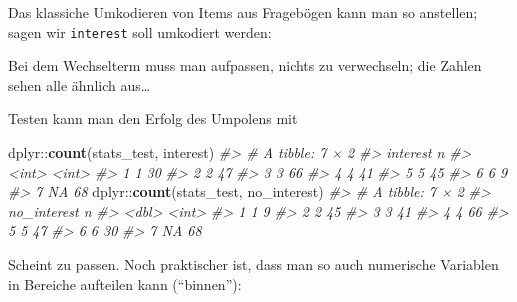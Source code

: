 \documentclass[12pt,]{book}
\newenvironment{Shaded}{\begin{snugshade}}{\end{snugshade}}
\newcommand{\KeywordTok}[1]{\textcolor[rgb]{0.13,0.29,0.53}{\textbf{{#1}}}}
\newcommand{\StringTok}[1]{\textcolor[rgb]{0.31,0.60,0.02}{{#1}}}
\newcommand{\CommentTok}[1]{\textcolor[rgb]{0.56,0.35,0.01}{\textit{{#1}}}}
\newcommand{\NormalTok}[1]{{#1}}
\begin{document}
Das klassiche Umkodieren von Items aus Fragebögen kann man so anstellen;
sagen wir \texttt{interest} soll umkodiert werden:

\begin{Shaded}
\end{Shaded}

Bei dem Wechselterm muss man aufpassen, nichts zu verwechseln; die
Zahlen sehen alle ähnlich aus\ldots{}

Testen kann man den Erfolg des Umpolens mit

\begin{Shaded}
\begin{Highlighting}[]
\NormalTok{dplyr::}\KeywordTok{count}\NormalTok{(stats_test, interest)}
\CommentTok{#> # A tibble: 7 × 2}
\CommentTok{#>   interest     n}
\CommentTok{#>      <int> <int>}
\CommentTok{#> 1        1    30}
\CommentTok{#> 2        2    47}
\CommentTok{#> 3        3    66}
\CommentTok{#> 4        4    41}
\CommentTok{#> 5        5    45}
\CommentTok{#> 6        6     9}
\CommentTok{#> 7       NA    68}
\NormalTok{dplyr::}\KeywordTok{count}\NormalTok{(stats_test, no_interest)}
\CommentTok{#> # A tibble: 7 × 2}
\CommentTok{#>   no_interest     n}
\CommentTok{#>         <dbl> <int>}
\CommentTok{#> 1           1     9}
\CommentTok{#> 2           2    45}
\CommentTok{#> 3           3    41}
\CommentTok{#> 4           4    66}
\CommentTok{#> 5           5    47}
\CommentTok{#> 6           6    30}
\CommentTok{#> 7          NA    68}
\end{Highlighting}
\end{Shaded}

Scheint zu passen. Noch praktischer ist, dass man so auch numerische
Variablen in Bereiche aufteilen kann (``binnen''):

\begin{Shaded}
\end{Shaded}
\end{document}
